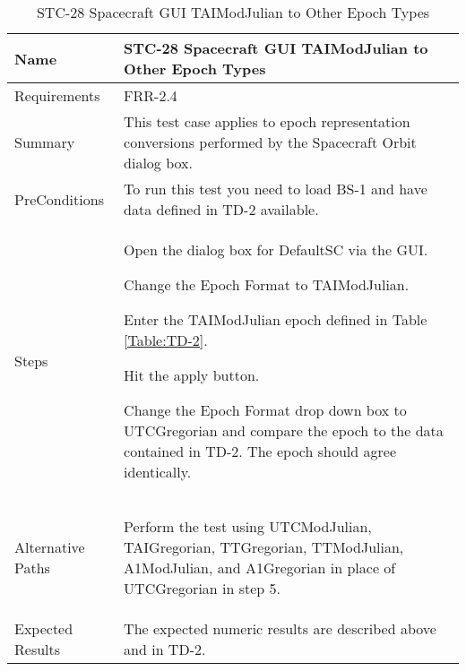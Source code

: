 \begin{table}[htbp!]
\centering
      \begin{tabular}{|p{1.05 in} |p{4.75 in} |}
      \hline
         \rowcolor[rgb]{0.8,0.8,0.8} Name & STC-28 Spacecraft GUI TAIModJulian to Other Epoch Types\\
         \hline
         Requirements & FRR-2.4\\ \hline
         Summary &
         This test case applies to epoch representation conversions performed by the Spacecraft Orbit dialog box.  \\
         \hline
         PreConditions & To run this test you need to load BS-1 and have data defined in TD-2 available.\\
         \hline
         Steps &
         \begin{compactenum}
         \item Open the dialog box for DefaultSC via the GUI.
         \item Change the Epoch Format to TAIModJulian.
         \item Enter the TAIModJulian epoch defined in Table \ref{Table:TD-2}.
         \item Hit the apply button.
         \item Change the Epoch Format drop down box to UTCGregorian and compare the epoch to the
          data contained in TD-2. The epoch should agree identically.
         \end{compactenum}\\
		 \hline
         Alternative Paths &
         \begin{compactenum}
         \item Perform the test using UTCModJulian, TAIGregorian, TTGregorian, TTModJulian, A1ModJulian,
         and A1Gregorian in place of UTCGregorian in step 5.
         \end{compactenum}\\
         \hline
         Expected Results & The expected numeric results are described above and in TD-2.\\
      \hline
\end{tabular}
      \label{Table:STC-28}
      \caption{STC-28 Spacecraft GUI TAIModJulian to Other Epoch Types}
\end{table} 
